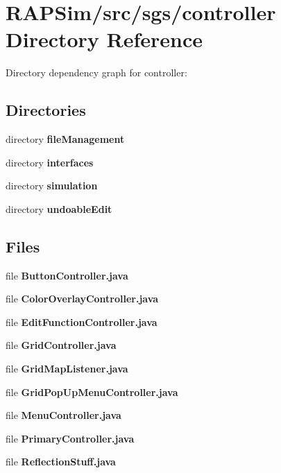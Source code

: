 \section{R\-A\-P\-Sim/src/sgs/controller Directory Reference}
\label{dir_99dd78d32466b9b10eb75d2afc9f75b3}
Directory dependency graph for controller\-:
\subsection*{Directories}
\begin{DoxyCompactItemize}
\item 
directory {\bf file\-Management}
\item 
directory {\bf interfaces}
\item 
directory {\bf simulation}
\item 
directory {\bf undoable\-Edit}
\end{DoxyCompactItemize}
\subsection*{Files}
\begin{DoxyCompactItemize}
\item 
file {\bf Button\-Controller.\-java}
\item 
file {\bf Color\-Overlay\-Controller.\-java}
\item 
file {\bf Edit\-Function\-Controller.\-java}
\item 
file {\bf Grid\-Controller.\-java}
\item 
file {\bf Grid\-Map\-Listener.\-java}
\item 
file {\bf Grid\-Pop\-Up\-Menu\-Controller.\-java}
\item 
file {\bf Menu\-Controller.\-java}
\item 
file {\bf Primary\-Controller.\-java}
\item 
file {\bf Reflection\-Stuff.\-java}
\end{DoxyCompactItemize}
